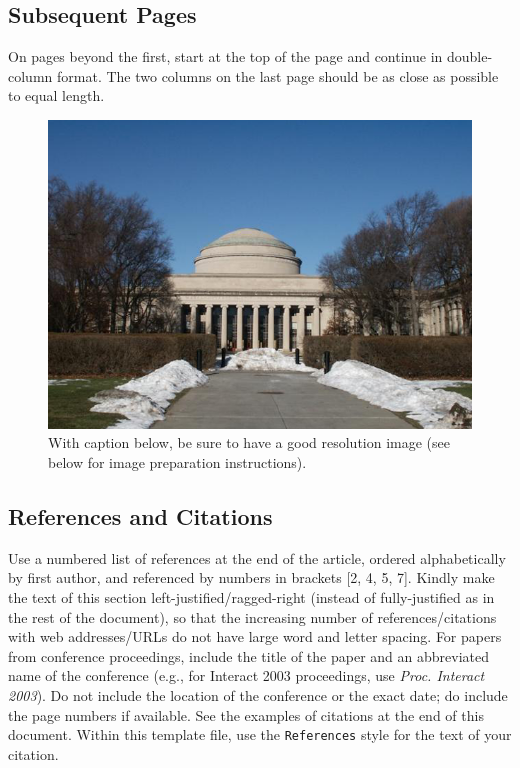 \documentclass{scsSimAUDPaperFormat}
\begin{document}
\subsection{Subsequent Pages}

On pages beyond the first, start at the top of the page and continue in double-column format. The two columns on the last page should be as close as possible to equal length.

\begin{figure}[!h]
\centering
\includegraphics[width=0.9\columnwidth]{Figure1}
\caption{With caption below, be sure to have a good resolution image (see below for image preparation instructions).}
\label{fig:figure1}
\end{figure}

\subsection{References and Citations}

Use a numbered list of references at the end of the article, ordered alphabetically by first author, and referenced by numbers in brackets [2, 4, 5, 7]. Kindly make the text of this section left-justified/ragged-right (instead of fully-justified as in the rest of the document), so that the increasing number of references/citations with web addresses/URLs do not have large word and letter spacing. For papers from conference proceedings, include the title of the paper and an abbreviated name of the conference (e.g., for Interact 2003 proceedings, use \textit{Proc. Interact 2003}). Do not include the location of the conference or the exact date; do include the page numbers if available. See the examples of citations at the end of this document. Within this template file, use the \texttt{References} style
for the text of your citation.
\end{document}
